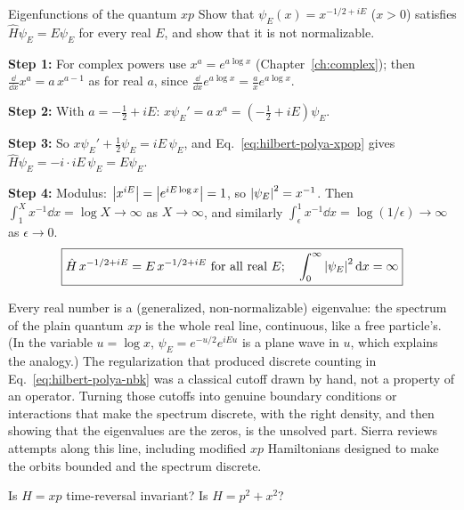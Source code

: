 \begin{sample}{Eigenfunctions of the quantum $xp$}
Show that $\psi_E(x)=x^{-1/2+iE}$ ($x>0$) satisfies $\hat H\psi_E=E\psi_E$ for every real $E$, and show that it is not normalizable.

\textbf{Step 1:} For complex powers use $x^a=e^{a\log x}$ (Chapter~\ref{ch:complex}); then $\frac{\dd}{\dd x}x^a=a\,x^{a-1}$ as for real $a$, since $\frac{\dd}{\dd x}e^{a\log x}=\frac ax e^{a\log x}$.

\textbf{Step 2:} With $a=-\tfrac12+iE$: $x\psi_E'=a\,x^{a}=\left(-\tfrac12+iE\right)\psi_E$.

\textbf{Step 3:} So $x\psi_E'+\tfrac12\psi_E=iE\,\psi_E$, and Eq.~\eqref{eq:hilbert-polya-xpop} gives $\hat H\psi_E=-i\cdot iE\,\psi_E=E\psi_E$.

\textbf{Step 4:} Modulus: $\left\lvert x^{iE}\right\rvert=\left\lvert e^{iE\log x}\right\rvert=1$, so $\left\lvert \psi_E\right\rvert^2=x^{-1}$. Then $\int_1^X x^{-1}\dd x=\log X\to\infty$ as $X\to\infty$, and similarly $\int_\epsilon^1x^{-1}\dd x=\log(1/\epsilon)\to\infty$ as $\epsilon\to0$.
\[
\boxed{\hat H\,x^{-1/2+iE}=E\,x^{-1/2+iE}\ \text{for all real }E;\quad\int_0^\infty\abs{\psi_E}^2\dd x=\infty}
\]
\end{sample}

Every real number is a (generalized, non-normalizable) eigenvalue: the spectrum of the plain quantum $xp$ is the whole real line, continuous, like a free particle's. (In the variable $u=\log x$, $\psi_E=e^{-u/2}e^{iEu}$ is a plane wave in $u$, which explains the analogy.) The regularization that produced discrete counting in Eq.~\eqref{eq:hilbert-polya-nbk} was a classical cutoff drawn by hand, not a property of an operator. Turning those cutoffs into genuine boundary conditions or interactions that make the spectrum discrete, with the right density, and then showing that the eigenvalues are the zeros, is the unsolved part. Sierra \cite{sierra} reviews attempts along this line, including modified $xp$ Hamiltonians designed to make the orbits bounded and the spectrum discrete.

\begin{checkpoint}
Is $H=xp$ time-reversal invariant? Is $H=p^2+x^2$?
\end{checkpoint}

